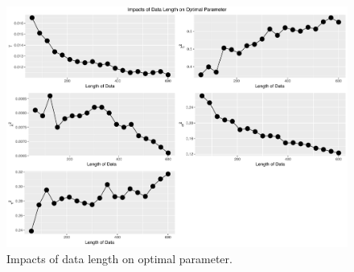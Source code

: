 \begin{figure}[h]
\centering
\includegraphics[width=\textwidth,height=0.5\textheight]{Chapters/05MCMCOU/plots/realdatalengthcompare.pdf}
\caption{Impacts of data length on optimal parameter. }
\end{figure}



